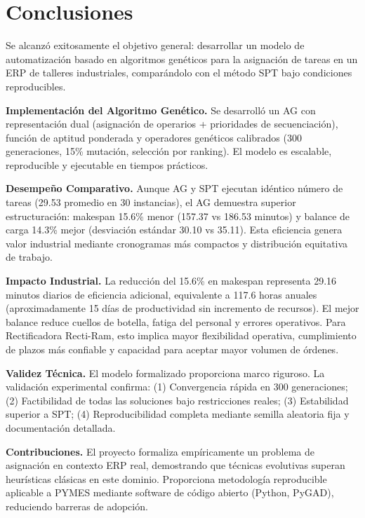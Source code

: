 \chapter{Conclusiones}

Se alcanzó exitosamente el objetivo general: desarrollar un modelo de automatización basado en algoritmos genéticos para la asignación de tareas en un ERP de talleres industriales, comparándolo con el método SPT bajo condiciones reproducibles.

\textbf{Implementación del Algoritmo Genético.} Se desarrolló un AG con representación dual (asignación de operarios + prioridades de secuenciación), función de aptitud ponderada y operadores genéticos calibrados (300 generaciones, 15\% mutación, selección por ranking). El modelo es escalable, reproducible y ejecutable en tiempos prácticos.

\textbf{Desempeño Comparativo.} Aunque AG y SPT ejecutan idéntico número de tareas (29.53 promedio en 30 instancias), el AG demuestra superior estructuración: makespan 15.6\% menor (157.37 vs 186.53 minutos) y balance de carga 14.3\% mejor (desviación estándar 30.10 vs 35.11). Esta eficiencia genera valor industrial mediante cronogramas más compactos y distribución equitativa de trabajo.

\textbf{Impacto Industrial.} La reducción del 15.6\% en makespan representa 29.16 minutos diarios de eficiencia adicional, equivalente a 117.6 horas anuales (aproximadamente 15 días de productividad sin incremento de recursos). El mejor balance reduce cuellos de botella, fatiga del personal y errores operativos. Para Rectificadora Recti-Ram, esto implica mayor flexibilidad operativa, cumplimiento de plazos más confiable y capacidad para aceptar mayor volumen de órdenes.

\textbf{Validez Técnica.} El modelo formalizado proporciona marco riguroso. La validación experimental confirma: (1) Convergencia rápida en 300 generaciones; (2) Factibilidad de todas las soluciones bajo restricciones reales; (3) Estabilidad superior a SPT; (4) Reproducibilidad completa mediante semilla aleatoria fija y documentación detallada.

\textbf{Contribuciones.} El proyecto formaliza empíricamente un problema de asignación en contexto ERP real, demostrando que técnicas evolutivas superan heurísticas clásicas en este dominio. Proporciona metodología reproducible aplicable a PYMES mediante software de código abierto (Python, PyGAD), reduciendo barreras de adopción.


